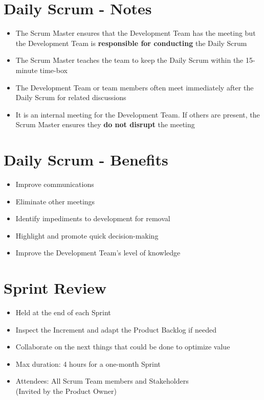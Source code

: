 \documentclass[a4paper,11pt,twocolumn]{article}
\begin{document}
\section*{Daily Scrum - Notes}
\begin{itemize}
	\item The Scrum Master ensures that the Development Team has the meeting but the Development Team is \textbf{responsible for conducting} the Daily Scrum
	\item The Scrum Master teaches the team to keep the Daily Scrum within the 15-minute time-box
	\item The Development Team or team members often meet immediately after the Daily Scrum for related discussions
    \item It is an internal meeting for the Development Team. If others are present, the Scrum Master ensures they \textbf{do not disrupt} the meeting
\end{itemize}

\section*{Daily Scrum - Benefits}
\begin{itemize}
	\item Improve communications
	\item Eliminate other meetings
	\item Identify impediments to development for removal
	\item Highlight and promote quick decision-making
	\item Improve the Development Team's level of knowledge
\end{itemize}

\section*{Sprint Review}
\begin{itemize}
	\item Held at the end of each Sprint
	\item Inspect the Increment and adapt the Product Backlog if needed
	\item Collaborate on the next things that could be done to optimize value
	\item Max duration: 4 hours for a one-month Sprint
	\item Attendees: All Scrum Team members and Stakeholders\\
	(Invited by the Product Owner)
\end{itemize}
\end{document}
